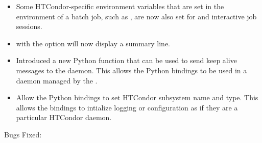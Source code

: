 \begin{itemize}
\item Some HTCondor-specific environment variables that are set in the
environment of a batch job, such as ,
 are now also set for
 and interactive job sessions.

\item {} with the  option will now display
a summary line.

\item Introduced a new Python function that can be used to send keep alive
messages to the  daemon. This allows the Python bindings to be
used in a daemon managed by the .

\item Allow the Python bindings to set HTCondor subsystem name and type.
This allows the bindings to intialize logging or configuration as if they
are a particular HTCondor daemon.

\end{itemize}

\noindent Bugs Fixed:

